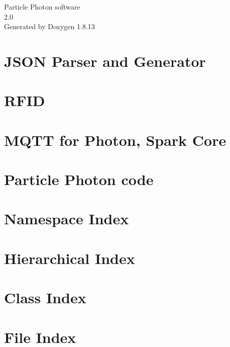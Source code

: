 \documentclass[twoside]{book}
\newcommand{\+}{\discretionary{\mbox{\scriptsize$\hookleftarrow$}}{}{}}
\newcommand{\clearemptydoublepage}{%
  \newpage{\pagestyle{empty}\cleardoublepage}%
}
\begin{document}
\begin{titlepage}
\vspace*{7cm}
\begin{center}%
{\Large Particle Photon software \\[1ex]\large 2.\+0 }\\
\vspace*{1cm}
{\large Generated by Doxygen 1.8.13}\\
\end{center}
\end{titlepage}
\clearemptydoublepage
{}
\tableofcontents
\clearemptydoublepage
{}

\chapter{J\+S\+ON Parser and Generator}
\label{md_lib__json_parser_generator_r_k__r_e_a_d_m_e}

\chapter{R\+F\+ID}
\label{md_lib__m_f_r_c522__r_e_a_d_m_e}

\chapter{M\+Q\+TT for Photon, Spark Core}
\label{md_lib__m_q_t_t__r_e_a_d_m_e}

\chapter{Particle Photon code}
\label{md__r_e_a_d_m_e}

\chapter{Namespace Index}

\chapter{Hierarchical Index}

\chapter{Class Index}

\chapter{File Index}

\end{document}
